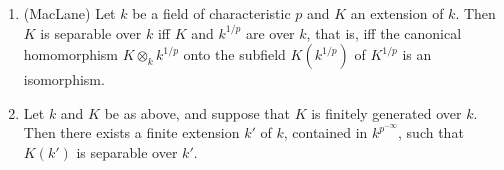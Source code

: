 \documentclass[../main]{subfiles}
\begin{document}
\begin{exercises}
\begin{enumerate}[label=\arabic*.]
    \item\label{exe:27.01} (MacLane) Let $k$ be a field of characteristic $p$ and $K$ an extension of $k$. Then $K$ is separable over $k$ iff $K$ and $k^{1/p}$ are  over $k$, that is, iff the canonical homomorphism $K \otimes_k k^{1/p}$ onto the subfield $K(k^{1/p})$ of $K^{1/p}$ is an isomorphism.
    \item\label{exe:27.02} Let $k$ and $K$ be as above, and suppose that $K$ is finitely generated over $k$. Then there exists a finite extension $k'$ of $k$, contained in $k^{p^{-\infty}}$, such that $K(k')$ is separable over $k'$. 
\end{enumerate}
\end{exercises}
\end{document}
